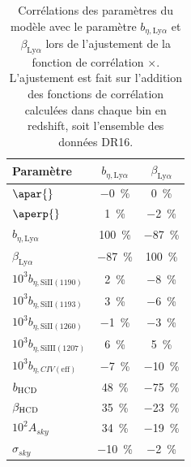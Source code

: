 \begin{table}[]
  \centering
  \caption{Corrélations des paramètres du modèle avec le paramètre $b_{\eta,\mathrm{Ly}\alpha}$ et $\beta_{\mathrm{Ly}\alpha}$ lors de l'ajustement de la fonction de corrélation \lya{}$\times$\lya{}. L'ajustement est fait sur l'addition des fonctions de corrélation calculées dans chaque bin en redshift, soit l'ensemble des données DR16.}
  \label{tab:corr_bias_lya}
  \begin{tabular}{lcc}
    \toprule
    Paramètre  & $b_{\eta,\mathrm{Ly}\alpha}$ & $\beta_{\mathrm{Ly}\alpha}$ \\
    \midrule
    $\apar{} $ & \SI{-0}{\percent} & \SI{0}{\percent}\\
    $\aperp{} $ & \SI{1}{\percent} & \SI{-2}{\percent} \\
    $b_{\eta, \mathrm{Ly}\alpha} $ & \SI{100}{\percent} & \SI{-87}{\percent} \\
    $\beta_{\mathrm{Ly}\alpha} $ & \SI{-87}{\percent} &  \SI{100}{\percent} \\
    $10^3 b_{\eta, \mathrm{SiII}(1190)} $ & \SI{2}{\percent} & \SI{-8}{\percent} \\
    $10^3 b_{\eta, \mathrm{SiII}(1193)} $ & \SI{3}{\percent} & \SI{-6}{\percent} \\
    $10^3 b_{\eta, \mathrm{SiII}(1260)} $ & \SI{-1}{\percent} & \SI{-3}{\percent} \\
    $10^3 b_{\eta, \mathrm{SiIII}(1207)} $ & \SI{6}{\percent} & \SI{5}{\percent}\\
    $10^3 b_{\eta, CIV(\mathrm{eff})} $ &\SI{-7}{\percent} & \SI{-10}{\percent}\\
    $b_{\textsc{HCD}} $ & \SI{48}{\percent} & \SI{-75}{\percent}\\
    $\beta_{\textsc{HCD}} $ & \SI{35}{\percent} & \SI{-23}{\percent}\\
    $10^2 A_{sky} $ & \SI{34}{\percent} & \SI{-19}{\percent}\\
    $\sigma_{sky} $ & \SI{-10}{\percent} & \SI{-2}{\percent}\\
    \bottomrule
\end{tabular}
\end{table}


